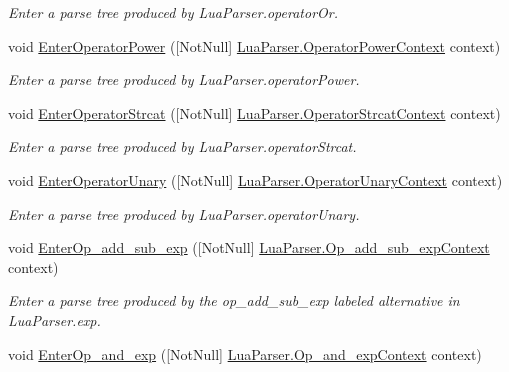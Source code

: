 \begin{DoxyCompactItemize}
\begin{DoxyCompactList}\small\item\em Enter a parse tree produced by Lua\+Parser.\+operator\+Or. \end{DoxyCompactList}\item 
void \mbox{\hyperlink{classzlua_1_1_compiler_a3e4509b5b2b44e581499d2264cf0e22f}{Enter\+Operator\+Power}} (\mbox{[}Not\+Null\mbox{]} \mbox{\hyperlink{classzlua_1_1_lua_parser_1_1_operator_power_context}{Lua\+Parser.\+Operator\+Power\+Context}} context)
\begin{DoxyCompactList}\small\item\em Enter a parse tree produced by Lua\+Parser.\+operator\+Power. \end{DoxyCompactList}\item 
void \mbox{\hyperlink{classzlua_1_1_compiler_a9e79fbc0bd20b36c90d0b53569a1f7d7}{Enter\+Operator\+Strcat}} (\mbox{[}Not\+Null\mbox{]} \mbox{\hyperlink{classzlua_1_1_lua_parser_1_1_operator_strcat_context}{Lua\+Parser.\+Operator\+Strcat\+Context}} context)
\begin{DoxyCompactList}\small\item\em Enter a parse tree produced by Lua\+Parser.\+operator\+Strcat. \end{DoxyCompactList}\item 
void \mbox{\hyperlink{classzlua_1_1_compiler_a1c085d48a4bc63b7b42cb8763f643bb2}{Enter\+Operator\+Unary}} (\mbox{[}Not\+Null\mbox{]} \mbox{\hyperlink{classzlua_1_1_lua_parser_1_1_operator_unary_context}{Lua\+Parser.\+Operator\+Unary\+Context}} context)
\begin{DoxyCompactList}\small\item\em Enter a parse tree produced by Lua\+Parser.\+operator\+Unary. \end{DoxyCompactList}\item 
void \mbox{\hyperlink{classzlua_1_1_compiler_abd725a31350fd6d1a132042ccda04b14}{Enter\+Op\+\_\+add\+\_\+sub\+\_\+exp}} (\mbox{[}Not\+Null\mbox{]} \mbox{\hyperlink{classzlua_1_1_lua_parser_1_1_op__add__sub__exp_context}{Lua\+Parser.\+Op\+\_\+add\+\_\+sub\+\_\+exp\+Context}} context)
\begin{DoxyCompactList}\small\item\em Enter a parse tree produced by the {\ttfamily op\+\_\+add\+\_\+sub\+\_\+exp} labeled alternative in Lua\+Parser.\+exp. \end{DoxyCompactList}\item 
void \mbox{\hyperlink{classzlua_1_1_compiler_a057cdeaef67ecf5a4d53ea10833b3d24}{Enter\+Op\+\_\+and\+\_\+exp}} (\mbox{[}Not\+Null\mbox{]} \mbox{\hyperlink{classzlua_1_1_lua_parser_1_1_op__and__exp_context}{Lua\+Parser.\+Op\+\_\+and\+\_\+exp\+Context}} context)

\end{DoxyCompactItemize}
